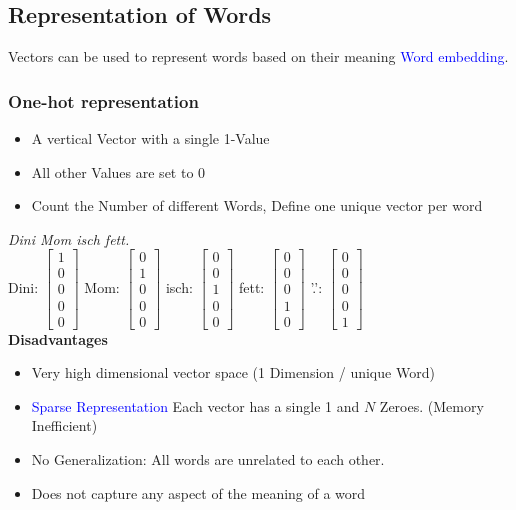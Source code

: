 \subsection{Representation of Words}
Vectors can be used to represent words based on their meaning \textcolor{blue}{Word embedding}.
\subsubsection{One-hot representation}
\begin{itemize}
    \item A vertical Vector with a single 1-Value
    \item All other Values are set to 0
    \item Count the Number of different Words, Define one unique vector per word
\end{itemize}
\textit{Dini Mom isch fett.}\\
Dini: $\begin{bmatrix} 1\\ 0\\ 0\\ 0\\ 0\end{bmatrix}$
Mom: $\begin{bmatrix} 0\\ 1\\ 0\\ 0\\ 0\end{bmatrix}$
isch: $\begin{bmatrix} 0\\ 0\\ 1\\ 0\\ 0\end{bmatrix}$
fett: $\begin{bmatrix} 0\\ 0\\ 0\\ 1\\ 0\end{bmatrix}$
'.': $\begin{bmatrix} 0\\ 0\\ 0\\ 0\\ 1\end{bmatrix}$\\
\textbf{Disadvantages}
\begin{itemize}
    \item Very high dimensional vector space (1 Dimension / unique Word)
    \item \textcolor{blue}{Sparse Representation} Each vector has a single 1 and $N$ Zeroes. (Memory Inefficient)
    \item No Generalization: All words are unrelated to each other.
    \item Does not capture any aspect of the meaning of a word
\end{itemize}

